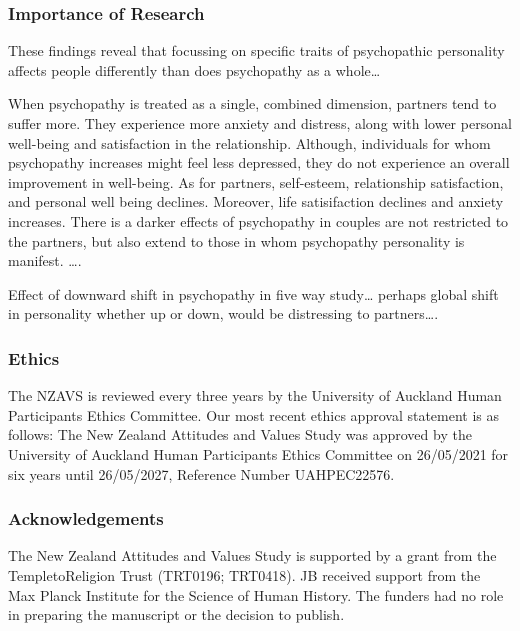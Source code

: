 \documentclass[
  singlecolumn]{article}
\begin{document}
\newpage{}

\subsubsection{Importance of Research}\label{importance-of-research}

These findings reveal that focussing on specific traits of psychopathic
personality affects people differently than does psychopathy as a
whole\ldots{}

When psychopathy is treated as a single, combined dimension, partners
tend to suffer more. They experience more anxiety and distress, along
with lower personal well-being and satisfaction in the relationship.
Although, individuals for whom psychopathy increases might feel less
depressed, they do not experience an overall improvement in well-being.
As for partners, self-esteem, relationship satisfaction, and personal
well being declines. Moreover, life satisifaction declines and anxiety
increases. There is a darker effects of psychopathy in couples are not
restricted to the partners, but also extend to those in whom psychopathy
personality is manifest. \ldots.

Effect of downward shift in psychopathy in five way study\ldots{}
perhaps global shift in personality whether up or down, would be
distressing to partners\ldots.

\newpage{}

\subsubsection{Ethics}\label{ethics}

The NZAVS is reviewed every three years by the University of Auckland
Human Participants Ethics Committee. Our most recent ethics approval
statement is as follows: The New Zealand Attitudes and Values Study was
approved by the University of Auckland Human Participants Ethics
Committee on 26/05/2021 for six years until 26/05/2027, Reference Number
UAHPEC22576.

\subsubsection{Acknowledgements}\label{acknowledgements}

The New Zealand Attitudes and Values Study is supported by a grant from
the TempletoReligion Trust (TRT0196; TRT0418). JB received support from
the Max Planck Institute for the Science of Human History. The funders
had no role in preparing the manuscript or the decision to publish.
\end{document}
